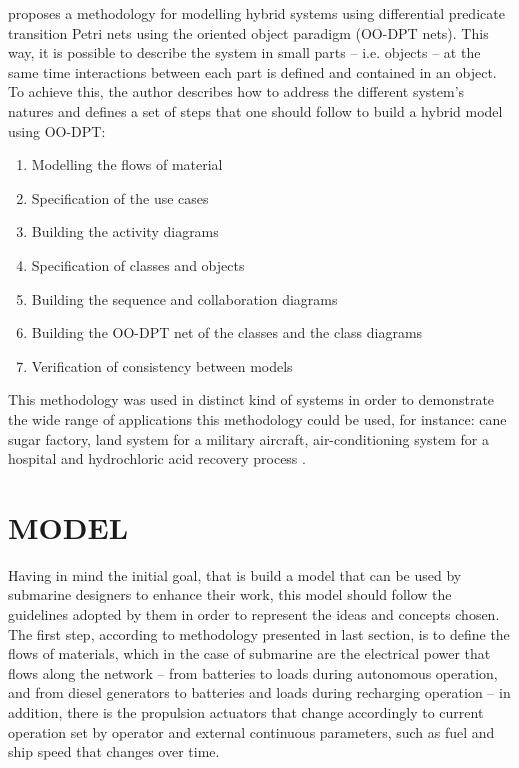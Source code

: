 \documentclass[10pt,fleqn,a4paper,twoside]{article}
\begin{document}
	\citet{Villani2004} proposes a methodology for modelling hybrid systems using differential predicate transition Petri nets using the oriented object paradigm (OO-DPT nets). This way, it is possible to describe the system in small parts -- i.e. objects -- at the same time interactions between each part is defined and contained in an object. To achieve this, the author describes how to address the different system's natures and defines a set of steps that one should follow to build a hybrid model using OO-DPT:

	\begin{enumerate}
		\item Modelling the flows of material
		\item Specification of the use cases
		\item Building the activity diagrams
		\item Specification of classes and objects
		\item Building the sequence and collaboration diagrams
		\item Building the OO-DPT net of the classes and the class diagrams
		\item Verification of consistency between models
	\end{enumerate}

	This methodology was used in distinct kind of systems in order to demonstrate the wide range of applications this methodology could be used, for instance: cane sugar factory, land system for a military aircraft, air-conditioning system for a hospital and hydrochloric acid recovery process \citep{Garcia2008} \citep{Villani2004} \citep{Villani2007}.

	\section{MODEL}
	\label{sec:model}

	Having in mind the initial goal, that is build a model that can be used by submarine designers to enhance their work, this model should follow the guidelines adopted by them in order to represent the ideas and concepts chosen. The first step, according to methodology presented in last section, is to define the flows of materials, which in the case of submarine are the electrical power that flows along the network -- from batteries to loads during autonomous operation, and from diesel generators to batteries and loads during recharging operation -- in addition, there is the propulsion actuators that change accordingly to current operation set by operator and external continuous parameters, such as fuel and ship speed that changes over time.
\end{document}
